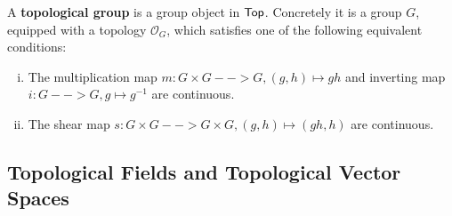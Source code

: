 \begin{definition}
	A \textbf{topological group} is a group object in $\textsf{Top}$. Concretely it is a group $G$, equipped with a topology $\mathcal{O}_G$, which satisfies one of the following equivalent conditions:
	\begin{enumerate}[(i)]
		\item{
			The multiplication map $m:G \times G --> G, (g,h) \mapsto gh$ and inverting map $i: G --> G, g \mapsto g^{-1}$ are continuous.
		}
		\item{
			The shear map $s: G \times G --> G \times G, (g,h) \mapsto (gh, h)$ are continuous.
		}
	\end{enumerate}
\end{definition}
\subsection{Topological Fields and Topological Vector Spaces}





